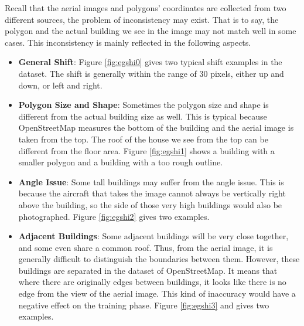 Recall that the aerial images and polygons' coordinates are collected from two different sources, the problem of inconsistency may exist. That is to say, the polygon and the actual building we see in the image may not match well in some cases. This inconsistency is mainly reflected in the following aspects.

\begin{itemize}
	\item \textbf{General Shift}: Figure \ref{fig:egshi0} gives two typical shift examples in the dataset. The shift is generally within the range of 30 pixels, either up and down, or left and right.
	\item \textbf{Polygon Size and Shape}: Sometimes the polygon size and shape is different from the actual building size as well. This is typical because OpenStreetMap measures the bottom of the building and the aerial image is taken from the top. The roof of the house we see from the top can be different from the floor area. Figure \ref{fig:egshi1} shows a building with a smaller polygon and a building with a too rough outline.
	\item \textbf{Angle Issue}: Some tall buildings may suffer from the angle issue. This is because the aircraft that takes the image cannot always be vertically right above the building, so the side of those very high buildings would also be photographed. Figure \ref{fig:egshi2} gives two examples.
	\item \textbf{Adjacent Buildings}: Some adjacent buildings will be very close together, and some even share a common roof. Thus, from the aerial image, it is generally difficult to distinguish the boundaries between them. However, these buildings are separated in the dataset of OpenStreetMap. It means that where there are originally edges between buildings, it looks like there is no edge from the view of the aerial image. This kind of inaccuracy would have a negative effect on the training phase. Figure \ref{fig:egshi3} and gives two examples.
\end{itemize}

